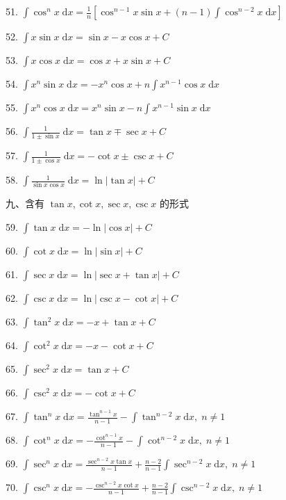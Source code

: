 51. \(\int {\cos }^{n}x\mathrm{\;d}x = \frac{1}{n}\left\lbrack  {{\cos }^{n - 1}x\sin x + \left( {n - 1}\right) \int {\cos }^{n - 2}x\mathrm{\;d}x}\right\rbrack\)

52. \(\int x\sin x\mathrm{\;d}x = \sin x - x\cos x + C\)

53. \(\int x\cos x\mathrm{\;d}x = \cos x + x\sin x + C\)

54. \(\int {x}^{n}\sin x\mathrm{\;d}x =  - {x}^{n}\cos x + n\int {x}^{n - 1}\cos x\mathrm{\;d}x\)

55. \(\int {x}^{n}\cos x\mathrm{\;d}x = {x}^{n}\sin x - n\int {x}^{n - 1}\sin x\mathrm{\;d}x\)

56. \(\int \frac{1}{1 \pm  \sin x}\mathrm{\;d}x = \tan x \mp  \sec x + C\)

57. \(\int \frac{1}{1 \pm  \cos x}\mathrm{\;d}x =  - \cot x \pm  \csc x + C\)

58. \(\int \frac{1}{\sin x\cos x}\mathrm{\;d}x = \ln \left| {\tan x}\right|  + C\)

九、含有 \(\tan x,\cot x,\sec x,\csc x\) 的形式

59. \(\int \tan x\mathrm{\;d}x =  - \ln \left| {\cos x}\right|  + C\)

60. \(\int \cot x\mathrm{\;d}x = \ln \left| {\sin x}\right|  + C\)

61. \(\int \sec x\mathrm{\;d}x = \ln \left| {\sec x + \tan x}\right|  + C\)

62. \(\int \csc x\mathrm{\;d}x = \ln \left| {\csc x - \cot x}\right|  + C\)

63. \(\int {\tan }^{2}x\mathrm{\;d}x =  - x + \tan x + C\)

64. \(\int {\cot }^{2}x\mathrm{\;d}x =  - x - \cot x + C\)

65. \(\int {\sec }^{2}x\mathrm{\;d}x = \tan x + C\)

66. \(\int {\csc }^{2}x\mathrm{\;d}x =  - \cot x + C\)

67. \(\int {\tan }^{n}x\mathrm{\;d}x = \frac{{\tan }^{n - 1}x}{n - 1} - \int {\tan }^{n - 2}x\mathrm{\;d}x,\;n \neq  1\)

68. \(\int {\cot }^{n}x\mathrm{\;d}x =  - \frac{{\cot }^{n - 1}x}{n - 1} - \int {\cot }^{n - 2}x\mathrm{\;d}x,\;n \neq  1\)

69. \(\int {\sec }^{n}x\mathrm{\;d}x = \frac{{\sec }^{n - 2}x\tan x}{n - 1} + \frac{n - 2}{n - 1}\int {\sec }^{n - 2}x\mathrm{\;d}x,\;n \neq  1\)

70. \(\int {\csc }^{n}x\mathrm{\;d}x =  - \frac{{\csc }^{n - 2}x\cot x}{n - 1} + \frac{n - 2}{n - 1}\int {\csc }^{n - 2}x\mathrm{\;d}x,\;n \neq  1\)

